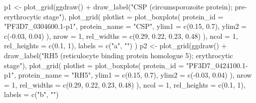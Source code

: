 \documentclass[
  11pt,
  oneside]{book}
\newenvironment{Shaded}{\begin{snugshade}}{\end{snugshade}}
\newcommand{\AttributeTok}[1]{\textcolor[rgb]{0.77,0.63,0.00}{#1}}
\newcommand{\DecValTok}[1]{\textcolor[rgb]{0.00,0.00,0.81}{#1}}
\newcommand{\FloatTok}[1]{\textcolor[rgb]{0.00,0.00,0.81}{#1}}
\newcommand{\FunctionTok}[1]{\textcolor[rgb]{0.00,0.00,0.00}{#1}}
\newcommand{\NormalTok}[1]{#1}
\newcommand{\OtherTok}[1]{\textcolor[rgb]{0.56,0.35,0.01}{#1}}
\newcommand{\SpecialCharTok}[1]{\textcolor[rgb]{0.00,0.00,0.00}{#1}}
\newcommand{\StringTok}[1]{\textcolor[rgb]{0.31,0.60,0.02}{#1}}
\begin{document}
\begin{Shaded}
\begin{Highlighting}[]
\NormalTok{p1 }\OtherTok{\textless{}{-}} \FunctionTok{plot\_grid}\NormalTok{(}\FunctionTok{ggdraw}\NormalTok{() }\SpecialCharTok{+} \FunctionTok{draw\_label}\NormalTok{(}\StringTok{"CSP (circumsporozoite protein); pre{-}erythrocytic stage"}\NormalTok{),}
  \FunctionTok{plot\_grid}\NormalTok{(}
    \AttributeTok{plotlist =} \FunctionTok{plot\_boxplots}\NormalTok{(}
      \AttributeTok{protein\_id =} \StringTok{"PF3D7\_0304600.1{-}p1"}\NormalTok{, }\AttributeTok{protein\_name =} \StringTok{"CSP"}\NormalTok{,}
      \AttributeTok{ylim1 =} \FunctionTok{c}\NormalTok{(}\FloatTok{0.15}\NormalTok{, }\FloatTok{0.7}\NormalTok{), }\AttributeTok{ylim2 =} \FunctionTok{c}\NormalTok{(}\SpecialCharTok{{-}}\FloatTok{0.03}\NormalTok{, }\FloatTok{0.04}\NormalTok{)}
\NormalTok{    ),}
    \AttributeTok{nrow =} \DecValTok{1}\NormalTok{, }\AttributeTok{rel\_widths =} \FunctionTok{c}\NormalTok{(}\FloatTok{0.29}\NormalTok{, }\FloatTok{0.22}\NormalTok{, }\FloatTok{0.23}\NormalTok{, }\FloatTok{0.48}\NormalTok{)}
\NormalTok{  ),}
  \AttributeTok{ncol =} \DecValTok{1}\NormalTok{, }\AttributeTok{rel\_heights =} \FunctionTok{c}\NormalTok{(}\FloatTok{0.1}\NormalTok{, }\DecValTok{1}\NormalTok{), }\AttributeTok{labels =} \FunctionTok{c}\NormalTok{(}\StringTok{"a"}\NormalTok{, }\StringTok{""}\NormalTok{)}
\NormalTok{)}
\NormalTok{p2 }\OtherTok{\textless{}{-}} \FunctionTok{plot\_grid}\NormalTok{(}\FunctionTok{ggdraw}\NormalTok{() }\SpecialCharTok{+} \FunctionTok{draw\_label}\NormalTok{(}\StringTok{"RH5 (reticulocyte binding protein homologue 5); erythrocytic stage"}\NormalTok{),}
  \FunctionTok{plot\_grid}\NormalTok{(}
    \AttributeTok{plotlist =} \FunctionTok{plot\_boxplots}\NormalTok{(}
      \AttributeTok{protein\_id =} \StringTok{"PF3D7\_0424100.1{-}p1"}\NormalTok{, }\AttributeTok{protein\_name =} \StringTok{"RH5"}\NormalTok{,}
      \AttributeTok{ylim1 =} \FunctionTok{c}\NormalTok{(}\FloatTok{0.15}\NormalTok{, }\FloatTok{0.7}\NormalTok{), }\AttributeTok{ylim2 =} \FunctionTok{c}\NormalTok{(}\SpecialCharTok{{-}}\FloatTok{0.03}\NormalTok{, }\FloatTok{0.04}\NormalTok{)}
\NormalTok{    ),}
    \AttributeTok{nrow =} \DecValTok{1}\NormalTok{, }\AttributeTok{rel\_widths =} \FunctionTok{c}\NormalTok{(}\FloatTok{0.29}\NormalTok{, }\FloatTok{0.22}\NormalTok{, }\FloatTok{0.23}\NormalTok{, }\FloatTok{0.48}\NormalTok{)}
\NormalTok{  ),}
  \AttributeTok{ncol =} \DecValTok{1}\NormalTok{, }\AttributeTok{rel\_heights =} \FunctionTok{c}\NormalTok{(}\FloatTok{0.1}\NormalTok{, }\DecValTok{1}\NormalTok{), }\AttributeTok{labels =} \FunctionTok{c}\NormalTok{(}\StringTok{"b"}\NormalTok{, }\StringTok{""}\NormalTok{)}

\end{Highlighting}
\end{Shaded}
\end{document}

